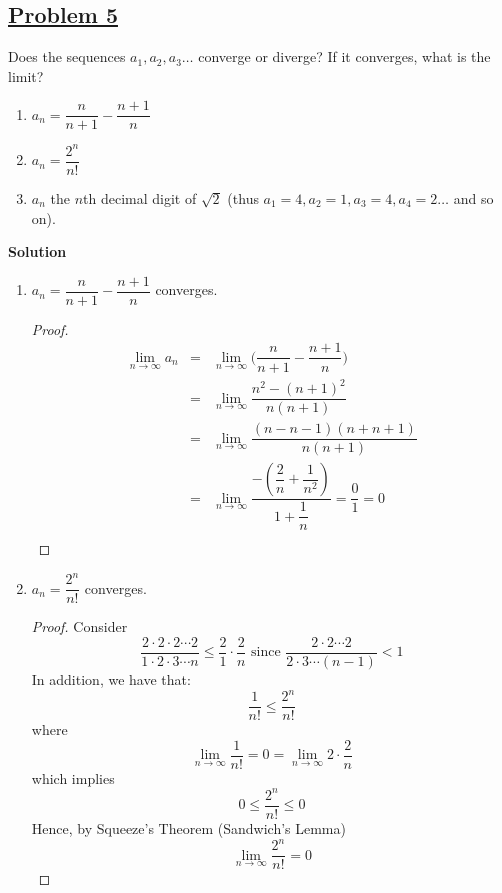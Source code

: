 \documentclass[10pt,letterpaper]{article}
\newcommand{\sol}{\textbf{Solution}}
\begin{document}
	\subsection*{{\color{red}\underline{Problem 5}}}
	Does the sequences $a_1, a_2, a_3 \ldots$ converge or diverge? If it converges, what is the limit?
	\begin{enumerate}[label=(\roman{*})]
		\item $a_n = \dfrac{n}{n + 1} - \dfrac{n + 1}{n}$
		\item $a_n = \dfrac{2^n}{n!}$
		\item $a_n$ the $n$th decimal digit of $\sqrt{2}$ (thus $a_1 = 4, a_2 = 1, a_3 = 4, a_4 = 2 \ldots$ and so on).
	\end{enumerate}
	\sol
	\begin{enumerate}[label=(\roman{*})]
		\item $a_n = \dfrac{n}{n + 1} - \dfrac{n + 1}{n}$ converges. 
		\begin{proof}
			\begin{eqnarray*}
				\displaystyle\lim_{n\to \infty} a_n &=&
				\displaystyle\lim_{n\to \infty} \bigg(\dfrac{n}{n + 1} - \dfrac{n + 1}{n}\bigg) \\
				&=& \displaystyle\lim_{n\to \infty} \dfrac{n^2 - (n + 1)^2}{n(n + 1)} \\
				&=& \displaystyle\lim_{n\to \infty} \dfrac{(n - n - 1)(n + n + 1)}{n(n + 1)} \\
				&=& \displaystyle\lim_{n\to \infty} \dfrac{-(\dfrac{2}{n} + \dfrac{1}{n^2})}{1 + \dfrac{1}{n}}
				= \dfrac{0}{1} = 0 \\
			\end{eqnarray*}
		\end{proof}
		\item $a_n = \dfrac{2^n}{n!}$ converges.
		\begin{proof}
			Consider $$\dfrac{2 \cdot 2 \cdot 2 \cdots 2}{1 \cdot 2 \cdot 3 \cdots n} \leq 
			\dfrac{2}{1} \cdot \dfrac{2}{n} \text{ since } \dfrac{2 \cdot 2 \cdots 2}{2 \cdot 3 \cdots (n - 1)} < 1$$
			In addition, we have that:
			$$\dfrac{1}{n!} \leq \dfrac{2^n}{n!}$$
			where
				$$\displaystyle\lim_{n\to \infty} \dfrac{1}{n!} = 0 = \displaystyle\lim_{n\to \infty} 2 \cdot \dfrac{2}{n}$$
			which implies
				$$0 \leq \dfrac{2^n}{n!} \leq 0$$			
			Hence, by Squeeze's Theorem (Sandwich's Lemma)
			$$\displaystyle\lim_{n\to \infty} \dfrac{2^n}{n!} = 0$$	
		\end{proof}
		

\end{enumerate}
\end{document}
